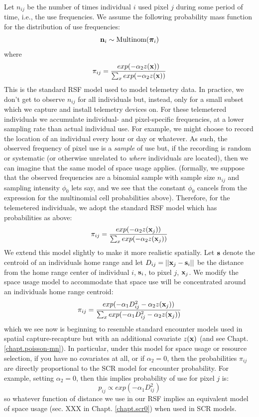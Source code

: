 Let $n_{ij}$ be the number of times individual $i$ used pixel $j$
during some period of time, i.e., the use frequencies.  We assume the
following probability mass function for the distribution of use
frequencies:
\[
{\bf n}_{i} \sim \mbox{Multinom}({\bm \pi}_{i})
\]
where
\[
 \pi_{ij} = \frac{ exp( -\alpha_{2} z({\bf x}) ) }{ \sum_{x}
   exp(-\alpha_{2} z({\bf x}))}
\]
This is the standard RSF model \citep{manly_etal:2002} used to model
telemetry data.  In practice, we don't get to observe $n_{ij}$ for all
individuals but, instead, only for a small subset which we capture and
install telemetry devices on.  For these telemetered individuals we
accumulate individual- and pixel-specific frequencies, at a lower
sampling rate than actual individual use. For example, we might choose
to record the location of an individual every hour or day or
whatever. As such, the observed frequency of pixel use is a {\it
  sample} of use but, if the recording is random or systematic (or
otherwise unrelated to {\it where} individuals are located), then we
can imagine that the same model of space usage applies. (formally, we
suppose that the observed frequencies are a binomial sample with
sample size $n_{ij}$ and sampling intensity $\phi_{0}$ lets say, and
we see that the constant $\phi_{0}$ cancels from the expression for
the multinomial cell probabilities above).  Therefore, for the
telemetered individuals, we adopt the standard RSF model which has
probabilities as above:
\[
 \pi_{ij} = \frac{ exp( -\alpha_{2} z({\bf x}_{j}) ) }{ \sum_{x}   exp(-\alpha_{2} z({\bf x}_{j}))}
\]
We extend this model slightly to make it more realistic spatially. Let
${\bf s}$ denote the centroid of an individuals home range and let
$D_{ij} = ||{\bf x}_{j} - {\bf s}_{i}||$ be the distance from the home
range center of individual $i$, ${\bf s}_{i}$, to pixel $j$, ${\bf
  x}_{j}$. We modify the space usage model to accommodate that space
use will be concentrated around an individuals home range centroid:
\begin{equation}
 \pi_{ij} = \frac{ exp( -\alpha_{1} D_{ij}^{2} -\alpha_{2} z({\bf x}_{j}) ) }
{ \sum_{x} exp(-\alpha_{1} D_{ij}^{2} -\alpha_{2} z({\bf x}_{j}))}
\label{rsf.eq.rsf}
\end{equation}
which we see now is beginning to resemble standard encounter models
used in spatial capture-recapture but with an additional covariate
$z({\bf x})$ (and see Chapt. \ref{chapt.poisson-mn}).
In particular, under this model for space usage or resource selection,
if you have no covariates at all, or if $\alpha_{2} =
0$, then
the probabilities $\pi_{ij}$ are directly proportional to the SCR
model for encounter probability.
For example, setting $\alpha_{2} = 0$, then this implies probability
of use for pixel $j$ is:
\[
p_{ij} \propto  exp( -\alpha_{1} D_{ij}^{2})
\]
so whatever function of distance we use in our RSF implies an
equivalent model of space usage (sec. XXX in Chapt. \ref{chapt.scr0}) when used in SCR models.

